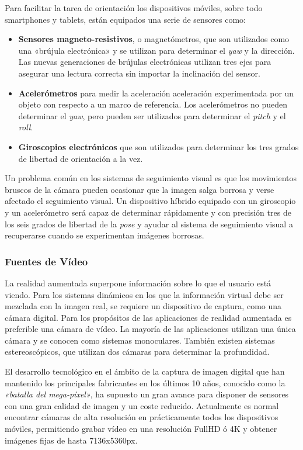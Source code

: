 Para facilitar la tarea de orientación los dispositivos móviles, sobre todo smartphones y tablets, están equipados una serie de sensores como:

\begin{itemize}
\item\textbf{Sensores magneto-resistivos}, o magnetómetros, que son utilizados como una «brújula electrónica» y se utilizan para determinar el \emph{yaw} y la dirección. Las nuevas generaciones de brújulas electrónicas utilizan tres ejes para asegurar una lectura correcta sin importar la inclinación del sensor.
\item\textbf{Acelerómetros} para medir la aceleración aceleración experimentada por un objeto con respecto a un marco de referencia. Los acelerómetros no pueden determinar el \emph{yaw}, pero pueden ser utilizados para determinar el \emph{pitch} y el \emph{roll}. 
\item\textbf{Giroscopios electrónicos} que son utilizados para determinar los tres grados de libertad de orientación a la vez.
\end{itemize}

Un problema común en los sistemas de seguimiento visual es que los movimientos bruscos de la cámara pueden ocasionar que la imagen salga borrosa y verse afectado el seguimiento visual. Un dispositivo híbrido equipado con un giroscopio y un acelerómetro será capaz de determinar rápidamente y con precisión tres de los seis grados de libertad de la \emph{pose} y ayudar al sistema de seguimiento visual a recuperarse cuando se experimentan imágenes borrosas. 

\subsubsection{Fuentes de Vídeo}
La realidad aumentada superpone información sobre lo que el usuario está viendo. Para los sistemas dinámicos en los que la información virtual debe ser mezclada con la imagen real, se requiere un dispositivo de captura, como una cámara digital. Para los propósitos de las aplicaciones de realidad aumentada es preferible una cámara de vídeo. La mayoría de las aplicaciones utilizan una única cámara y se conocen como sistemas monoculares. También existen sistemas estereoscópicos, que  utilizan dos cámaras para determinar la profundidad.

El desarrollo tecnológico en el ámbito de la captura de imagen digital que han mantenido los principales fabricantes en los últimos 10 años, conocido como la \textit{«batalla del mega-píxel»}, ha supuesto un gran avance para disponer de sensores con una gran calidad de imagen y un coste reducido. Actualmente es normal encontrar cámaras de alta resolución en prácticamente todos los dispositivos móviles, permitiendo grabar vídeo en una resolución FullHD ó 4K y obtener imágenes fijas de hasta 7136x5360px.

